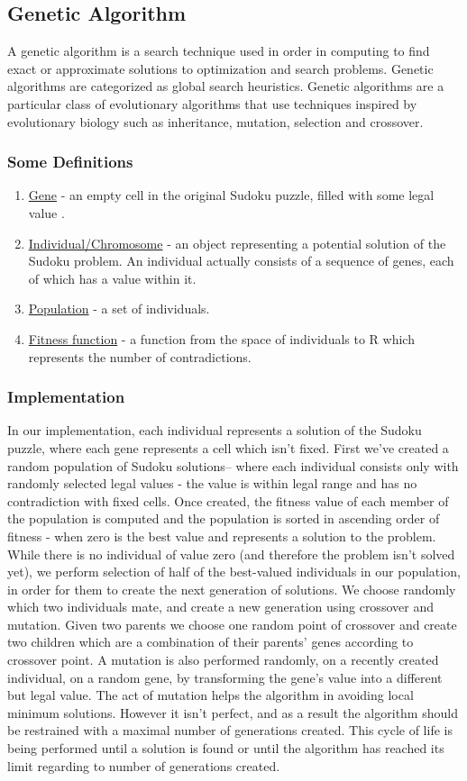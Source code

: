 \documentclass[fleqn,10pt]{SelfArx}
\begin{document}
\subsection{Genetic Algorithm}
A genetic algorithm is a search technique used in order in computing to find exact or approximate solutions to optimization and search problems. Genetic algorithms are categorized as global search heuristics. Genetic algorithms are a particular class of evolutionary algorithms that use techniques inspired by evolutionary biology such as inheritance, mutation, selection and crossover.
\subsubsection{Some Definitions}
\begin{enumerate}
\item \underline{Gene} - an empty cell in the original Sudoku puzzle, filled with some legal value .
\item \underline{Individual/Chromosome} - an object representing a potential solution of the Sudoku problem. An individual actually consists of a sequence of genes, each of which has a value within it.
\item \underline{Population} - a set of individuals.
\item \underline{Fitness function} - a function from the space of individuals to R which represents the number of contradictions.
\end{enumerate}
\subsubsection{Implementation}
In our implementation, each individual represents a solution of the Sudoku puzzle, where each gene represents a cell which isn't fixed.
First we've created a random population of Sudoku solutions– where each individual consists only with randomly selected legal values - the value is within legal range and has no contradiction with fixed cells.
Once created, the fitness value of each member of the population is computed and the population is sorted in ascending order of fitness - when zero is the best value and represents a solution to the problem.
While there is no individual of value zero (and therefore the problem isn't solved yet), we perform selection of half of the best-valued individuals in our population, in order for them to create the next generation of solutions.
We choose randomly which two individuals mate, and create a new generation using crossover and mutation.
Given two parents we choose one random point of crossover and create two children which are a combination of their parents' genes according to crossover point.
A mutation is also performed randomly, on a recently created individual, on a random gene, by transforming the gene's value into a different but legal value.
The act of mutation helps the algorithm in avoiding local minimum solutions. However it isn't perfect, and as a result the algorithm should be restrained with a maximal number of generations created.
This cycle of life is being performed until a solution is found or until the algorithm has reached its limit regarding to number of generations created.
\end{document}
